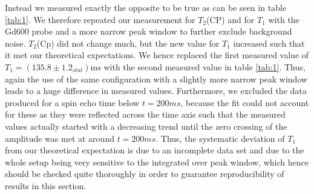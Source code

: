 Instead we measured exactly the opposite to be true as can be seen in table \ref{tab:1}. We therefore repeated our measurement for $T_2$(CP) and for $T_1$ with the Gd600 probe and a more narrow peak window to further exclude background noise. $T_2$(Cp) did not change much, but the new value for $T_1$ increased such that it met our theoretical expectations. We hence replaced the first measured value of $T_1 = \left(135.8 \pm 1.2_{stat}\right)\mathrm{ms}$ with the second measured value in table \ref{tab:1}. Thus, again the use of the same configuration with a slightly more narrow peak window leads to a huge difference in measured values. Furthermore, we excluded the data produced for a spin echo time below $t=200ms$, because the fit could not account for these as they were reflected across the time axis such that the measured values actually started with a decreasing trend until the zero crossing of the amplitude was met at around $t=200ms$. Thus, the systematic deviation of $T_1$ from our theoretical expectation is due to an incomplete data set and due to the whole setup being very sensitive to the integrated over peak window, which hence should be checked quite thoroughly in order to guarantee reproducibility of results in this section.\\




